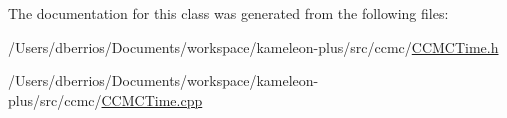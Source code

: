 The documentation for this class was generated from the following files\-:\begin{DoxyCompactItemize}
\item 
/\-Users/dberrios/\-Documents/workspace/kameleon-\/plus/src/ccmc/\hyperlink{_c_c_m_c_time_8h}{C\-C\-M\-C\-Time.\-h}\item 
/\-Users/dberrios/\-Documents/workspace/kameleon-\/plus/src/ccmc/\hyperlink{_c_c_m_c_time_8cpp}{C\-C\-M\-C\-Time.\-cpp}\end{DoxyCompactItemize}
